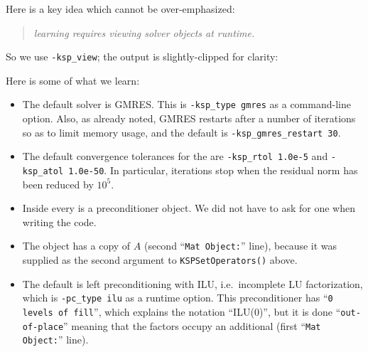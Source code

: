 Here is a key idea which cannot be over-emphasized:
\begin{quote}
\emph{learning \PETSc requires viewing \emph{solver} objects at runtime.}
\end{quote}
So we use \texttt{-ksp\_view}; the output is slightly-clipped for clarity:
Here is some of what we learn:
\begin{itemize}
\item The default \pKSP solver is GMRES.  This is \texttt{-ksp\_type gmres} as a command-line option.  Also, as already noted, GMRES restarts after a number of iterations so as to limit memory usage, and the default is \texttt{-ksp\_gmres\_restart 30}.
\item The default convergence tolerances for the \pKSP are \texttt{-ksp\_rtol 1.0e-5} and \texttt{-ksp\_atol 1.0e-50}.  In particular, iterations stop when the residual norm has been reduced by $10^5$.
\item Inside every \pKSP is a \pPC preconditioner object.  We did not have to ask for one when writing the code.
\item The \pPC object has a copy of $A$ (second ``\texttt{Mat Object:}'' line), because it was supplied as the second argument to \texttt{KSPSetOperators()} above.
\item The default \pPC is left preconditioning with ILU, i.e.~incomplete LU factorization, which is \texttt{-pc\_type ilu} as a runtime option.  This preconditioner has ``\texttt{0 levels of fill}'', which explains the notation ``ILU($0$)'', but it is done ``\texttt{out-of-place}'' meaning that the factors occupy an additional \pMat (first ``\texttt{Mat Object:}'' line).
\end{itemize}

